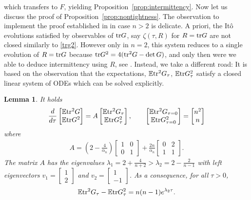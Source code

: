 \documentclass[english, letterpaper,12pt,reqno]{amsart}
\newtheorem{lemma}[theorem]{Lemma}
\theoremstyle{remark}
\theoremstyle{plain}
\newcommand{\1}{\mathbf{1}}
\def\bbE{\mathbb E}
\def\tr{{\rm tr}}
\begin{document}
%
which transfers to $F$, yielding Proposition~\ref{prop:intermittency}.
%
\noindent
Now let us discuss the proof of Proposition~\ref{prop:nontightness}. The observation to implement the proof established in \cite{OW24} in case $n>2$ is delicate. A priori, the Itô evolutions satisfied by observables of $\tr G$, say $\zeta(\tau,R)$ for $R=\tr G$ are not closed similarly to \eqref{trg2}. However only in $n=2$, this system reduces to a single evolution of $R=\tr G$ because $\tr G^2=4(\tr^2 G - \det G)$, and only then were we able to deduce intermittency using $R$, see \cite[Section 3]{MOW25}. Instead, we take a different road: It is based on the observation that the expectations, $\bbE \tr^2 G_{\tau}$, $\bbE \tr G_\tau^2$ satisfy a closed linear system of ODEs which can be solved explicitly. 
%
\begin{lemma}\label{Lem:2by2}
  It holds
   \begin{align*}
    \frac{d}{d\tau}\begin{bmatrix}
        \bbE \tr^2 G \\ \bbE \tr G^2
    \end{bmatrix}  = A \begin{bmatrix}
        \bbE \tr^2 G_\tau \\ \bbE \tr G_\tau^2
    \end{bmatrix}, \quad \quad
   \begin{bmatrix}
        \bbE \tr^2 G_{\tau=0} \\ \bbE \tr  G_{\tau=0}^2
    \end{bmatrix} = \begin{bmatrix}
    n^2\\n
\end{bmatrix}
\end{align*}
%
where 
%
\begin{align*}
    A=(2-\frac{4}{\alpha_n}) \begin{bmatrix}
        1&0\\
        0&1
    \end{bmatrix}+\frac{2n}{\alpha_n}\begin{bmatrix}
        0&2\\
        1&1
    \end{bmatrix}.
\end{align*}
%
The matrix $A$ has the eigenvalues $\lambda_1=2+\frac{4}{n+2}> \lambda_2=2-\frac{2}{n-1}$ with left eigenvectors $v_1=\begin{bmatrix}
    1\\2
\end{bmatrix}$ and $v_2=\begin{bmatrix}
    1\\-1
\end{bmatrix}$. As a consequence, for all $\tau>0$, 
%
\begin{align}\label{difference}
 \bbE  \tr^2G_{\tau}-\bbE \tr G_\tau^2  = n(n-1) e^{\lambda_2\tau}.  
\end{align}
%
\end{lemma}
\end{document}
